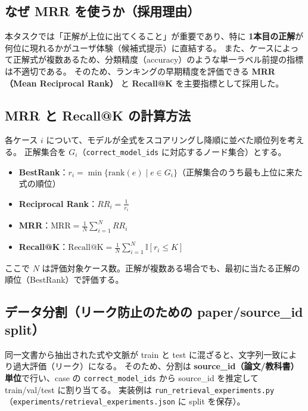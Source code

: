 \documentclass[11pt,a4paper]{jsarticle}
\begin{document}
\subsection{なぜ MRR を使うか（採用理由）}
本タスクでは「正解が上位に出てくること」が重要であり、特に \textbf{1本目の正解}が何位に現れるかがユーザ体験（候補式提示）に直結する。
また、ケースによって正解式が複数あるため、分類精度（accuracy）のような単一ラベル前提の指標は不適切である。
そのため、ランキングの早期精度を評価できる \textbf{MRR（Mean Reciprocal Rank）} と \textbf{Recall@K} を主要指標として採用した。

\subsection{MRR と Recall@K の計算方法}
各ケース $i$ について、モデルが全式をスコアリングし降順に並べた順位列を考える。
正解集合を $G_i$（\texttt{correct\_model\_ids} に対応するノード集合）とする。
\begin{itemize}[nosep]
  \item \textbf{BestRank}：$r_i=\min\{ \text{rank}(e)\mid e\in G_i\}$（正解集合のうち最も上位に来た式の順位）
  \item \textbf{Reciprocal Rank}：$RR_i=\frac{1}{r_i}$
  \item \textbf{MRR}：$\mathrm{MRR}=\frac{1}{N}\sum_{i=1}^{N} RR_i$
  \item \textbf{Recall@K}：$\mathrm{Recall@K}=\frac{1}{N}\sum_{i=1}^{N}\mathbb{I}[r_i\le K]$
\end{itemize}
ここで $N$ は評価対象ケース数。正解が複数ある場合でも、最初に当たる正解の順位（BestRank）で評価する。

\subsection{データ分割（リーク防止のための paper/source\_id split）}
同一文書から抽出された式や文脈が train と test に混ざると、文字列一致により過大評価（リーク）になる。
そのため、分割は \textbf{source\_id（論文/教科書）単位}で行い、case の \texttt{correct\_model\_ids} から source\_id を推定して train/val/test に割り当てる。
実装例は \texttt{run\_retrieval\_experiments.py}（\texttt{experiments/retrieval\_experiments.json} に split を保存）。
\end{document}
